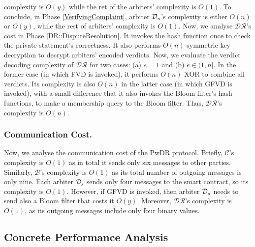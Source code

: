 complexity is $O(y)$ while the ret of the arbiters' complexity is $O(1)$. To conclude, in Phase \ref{VerifyingComplaint},  arbiter $\mathcal{D}_{\scriptscriptstyle n}$'s complexity is either $O(n)$ or $O(y)$, while the rest of arbiters' complexity is $O(1)$. Now, we analyse $\mathcal{DR}$'s cost in Phase \ref{DR::DisputeResolution}. It invokes the hash function once to check the private statement's correctness. It also performs $O(n)$ symmetric key decryption to decrypt arbiters' encoded verdicts. Now, we evaluate the verdict decoding complexity of $\mathcal{DR}$ 
for two cases: (a) $e = 1$ and (b) $e \in (1, n]$. In the former case (in which  FVD is invoked), it performs $O(n)$ XOR to combine all verdicts. Its complexity is also $O(n)$ in the latter case (in which  GFVD is invoked), with a small difference that it also invokes the Bloom filter's hash functions, to make a membership query to the Bloom filter.  Thus, $\mathcal{DR}$'s complexity is $O(n)$. 



\subsubsection{Communication Cost.} Now, we analyse the communication cost of the PwDR protocol. Briefly, $\mathcal{C}$'s complexity is $O(1)$ as in total it sends only six messages to other parties. Similarly, $\mathcal{B}$'s complexity is $O(1)$ as its total number of outgoing messages is only nine. Each arbiter $\mathcal{D}_{\scriptscriptstyle j}$ sends only four messages to the smart contract, so its complexity is $O(1)$. However, if GFVD is invoked, then arbiter $\mathcal{D}_{\scriptscriptstyle n}$ needs to send also a Bloom filter that costs it $O(y)$. Moreover, $\mathcal{DR}$'s complexity is $O(1)$, as its outgoing messages include  only four binary values. 


\subsection{Concrete Performance Analysis}

